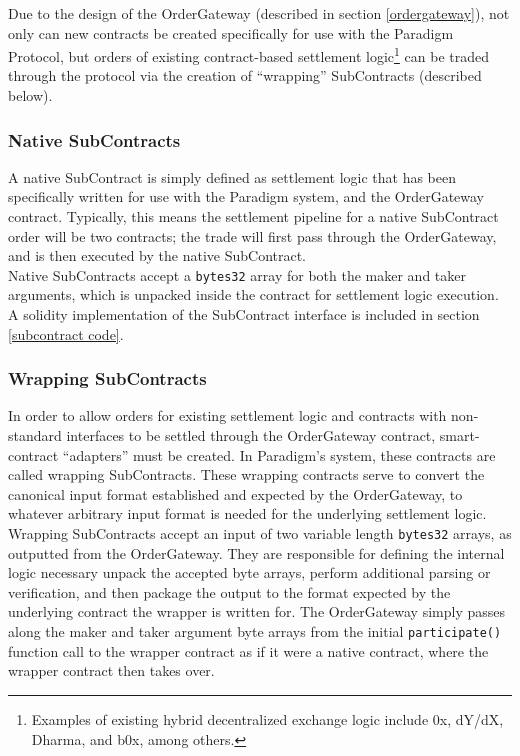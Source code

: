 \documentclass[9pt]{article}
\begin{document}
\noindent Due to the design of the OrderGateway (described in section \ref{ordergateway}), not only can new contracts be created specifically for use with the Paradigm Protocol, but orders of existing contract-based settlement logic\footnote{Examples of existing hybrid decentralized exchange logic include 0x, dY/dX, Dharma, and b0x, among others.} can be traded through the protocol via the creation of “wrapping” SubContracts (described below).

\subsubsection{Native SubContracts}
\noindent A native SubContract is simply defined as settlement logic that has been specifically written for use with the Paradigm system, and the OrderGateway contract. Typically, this means the settlement pipeline for a native SubContract order will be two contracts; the trade will first pass through the OrderGateway, and is then executed by the native SubContract. \\

\noindent Native SubContracts accept a \texttt{bytes32} array for both the maker and taker arguments, which is unpacked inside the contract for settlement logic execution. A solidity implementation of the SubContract interface is included in section \ref{subcontract code}.

\subsubsection{Wrapping SubContracts}
\noindent In order to allow orders for existing settlement logic and contracts with non-standard interfaces to be settled through the OrderGateway contract, smart-contract “adapters” must be created. In Paradigm’s system, these contracts are called wrapping SubContracts. These wrapping contracts serve to convert the canonical input format established and expected by the OrderGateway, to whatever arbitrary input format is needed for the underlying settlement logic. \\

\noindent Wrapping SubContracts accept an input of two variable length \texttt{bytes32} arrays, as outputted from the OrderGateway. They are responsible for defining the internal logic necessary unpack the accepted byte arrays, perform additional parsing or verification, and then package the output to the format expected by the underlying contract the wrapper is written for. The OrderGateway simply passes along the maker and taker argument byte arrays from the initial \texttt{participate()} function call to the wrapper contract as if it were a native contract, where the wrapper contract then takes over. \\
\end{document}
